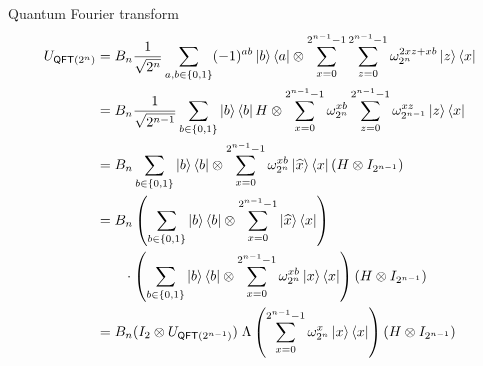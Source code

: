 \documentclass{beamer}
\begin{document}
\begin{frame}{Quantum Fourier transform}
\small
\vspace{-1em}
\begin{align*}
U_{\mathsf{QFT}(2^n)} &= B_n\frac1{\sqrt{2^{n}}}\sum_{a,b\in\{0,1\}}(-1)^{ab}\ket{b}\bra{a}\otimes \sum_{x=0}^{2^{n-1}-1}\sum_{z=0}^{2^{n-1}-1}\omega_{2^n}^{2xz + xb}\ket{z}\bra{x}\\
&= B_n\frac1{\sqrt{2^{n-1}}}\sum_{b\in\{0,1\}}\ket{b}\bra{b}H\otimes \sum_{x=0}^{2^{n-1}-1}\omega_{2^n}^{xb}\sum_{z=0}^{2^{n-1}-1}\omega_{2^{n-1}}^{xz}\ket{z}\bra{x}\\
&= B_n\sum_{b\in\{0,1\}}\ket{b}\bra{b}\otimes \sum_{x=0}^{2^{n-1}-1}\omega_{2^n}^{xb}\ket{\widehat{x}}\bra{x}  (H\otimes I_{2^{n-1}})\\
&= B_n\left(\sum_{b\in\{0,1\}}\ket{b}\bra{b}\otimes \sum_{x=0}^{2^{n-1}-1}\ket{\widehat{x}}\bra{x}\right)\\
&\qquad\cdot\left(\sum_{b\in\{0,1\}}\ket{b}\bra{b}\otimes \sum_{x=0}^{2^{n-1}-1}\omega_{2^n}^{xb}\ket{x}\bra{x}\right)  (H\otimes I_{2^{n-1}})\\
&= B_n (I_2\otimes U_{\mathsf{QFT}(2^{n-1})}) \; \Lambda\left(\sum_{x=0}^{2^{n-1}-1}\omega_{2^n}^{x}\ket{x}\bra{x}\right) (H\otimes I_{2^{n-1}})
\end{align*}
\end{frame}
\end{document}
